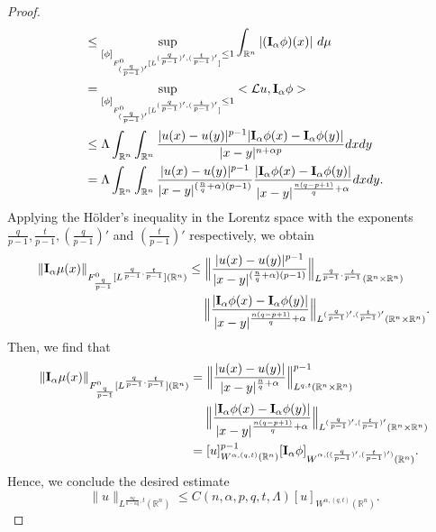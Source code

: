 \documentclass[12pt]{amsart}
\newcommand{\R}{\mathbb{R}}
\newcommand{\I}{{\bf{I}}}
\numberwithin{equation}{section}
\theoremstyle{plain}
\theoremstyle{definition}
\theoremstyle{remark}
\begin{document}
\begin{proof}
\begin{align*}
&\leq\sup_{[\phi]_{F^{0}_{(\frac{q}{p-1})'}[L^{(\frac{q}{p-1})',(\frac{t}{p-1})'}]}\leq 1}\int_{\R^{n}} | (\I_{\alpha}\phi)(x)|\ d\mu\\
&=\sup_{[\phi]_{F^{0}_{(\frac{q}{p-1})'}[L^{(\frac{q}{p-1})',(\frac{t}{p-1})'}]}\leq 1}<\mathcal{L}u, \I_{\alpha}\phi>\\
&\leq \Lambda\int_{\R^{n}}\int_{\R^{n}} \frac{|u(x)-u(y)|^{p-1}  |\I_{\alpha}\phi(x)-\I_{\alpha}\phi(y)|}{|x-y|^{n+\alpha p}}dxdy\\
&= \Lambda\int_{\R^{n}}\int_{\R^{n}} \frac{|u(x)-u(y)|^{p-1}}{|x-y|^{(\frac{n}{q}+\alpha)(p-1)}}\frac{|\I_{\alpha}\phi(x)-\I_{\alpha}\phi(y)|}{|x-y|^{\frac{n(q-p+1)}{q}+\alpha}}dxdy.
\end{align*}
Applying the H\"{o}lder's inequality in the Lorentz space with the exponents $\frac{q}{p-1}, \frac{t}{p-1}, (\frac{q}{p-1})'$ and $(\frac{t}{p-1})'$ respectively, we  obtain
\begin{align*}
\|\I_{\alpha}\mu(x)\|_{F^{0}_{\frac{q}{p-1}}[L^{\frac{q}{p-1},\frac{t}{p-1}}](\R^{n})}&\leq \Big\|  \frac{|u(x)-u(y)|^{p-1}}{|x-y|^{(\frac{n}{q}+\alpha)(p-1) }} \Big\|_{L^{\frac{q}{p-1},\frac{t}{p-1}}(\R^{n}\times\R^{n})}\\
&\quad\;\Big\| \frac{|\I_{\alpha}\phi(x)-\I_{\alpha}\phi(y)|}{|x-y|^{\frac{n(q-p+1)}{q}+\alpha }} \Big\|_{L^{(\frac{q}{p-1})',(\frac{t}{p-1})'}(\R^{n}\times\R^{n})}.
\end{align*}
Then, we find that
\begin{align*}
\|\I_{\alpha}\mu(x)\|_{F^{0}_{\frac{q}{p-1}}[L^{\frac{q}{p-1},\frac{t}{p-1}}](\R^{n})}&=\Big\|  \frac{|u(x)-u(y)|}{|x-y|^{\frac{n}{q}+\alpha }} \Big\|_{L^{q,t}(\R^{n}\times\R^{n})}^{p-1}\\
&\quad\;\Big\| \frac{|\I_{\alpha}\phi(x)-\I_{\alpha}\phi(y)|}{|x-y|^{\frac{n(q-p+1)}{q}+\alpha }} \Big\|_{L^{(\frac{q}{p-1})',(\frac{t}{p-1})'}(\R^{n}\times\R^{n})}\\
&=[u]_{W^{\alpha,(q,t)}(\R^{n})}^{p-1} [\I_{\alpha}\phi]_{W^{\alpha, ((\frac{q}{p-1})',(\frac{t}{p-1})') }(\R^{n})}.
\end{align*}
Hence, we conclude the desired estimate
\[
\|u\|_{L^{\frac{nq}{n-\alpha q},t}(\R^{n})} \leq C(n,\alpha,p,q,t,\Lambda) [u]_{W^{\alpha,(q,t)}(\R^{n})}.
\]
\end{proof}


\end{document}
